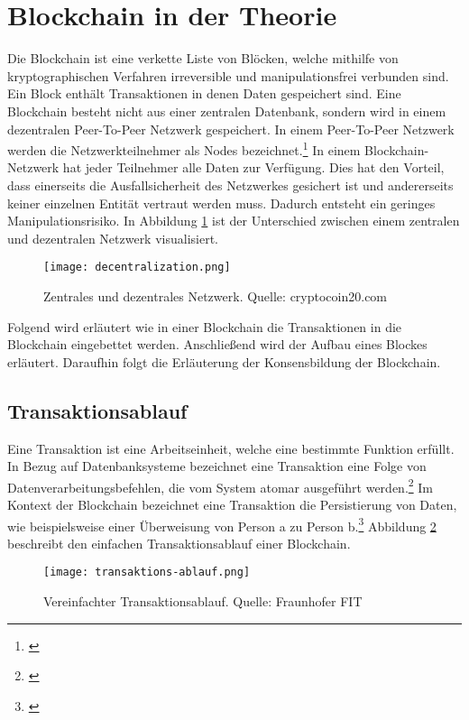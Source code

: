 \section{Blockchain in der Theorie}
\label{sec:Theorie}
Die Blockchain ist eine verkette Liste von Blöcken, welche mithilfe von kryptographischen Verfahren irreversible und manipulationsfrei verbunden sind. Ein Block enthält Transaktionen in denen Daten gespeichert sind. Eine Blockchain besteht nicht aus einer zentralen Datenbank, sondern wird in einem dezentralen Peer-To-Peer Netzwerk gespeichert. In einem Peer-To-Peer Netzwerk werden die Netzwerkteilnehmer als Nodes bezeichnet.\footnote{\cite[S.~5]{Korzun.2013}} In einem Blockchain-Netzwerk hat jeder Teilnehmer alle Daten zur Verfügung. Dies hat den Vorteil, dass einerseits die Ausfallsicherheit des Netzwerkes gesichert ist und andererseits keiner einzelnen Entität vertraut werden muss. Dadurch entsteht ein geringes Manipulationsrisiko. In Abbildung \ref{fig:dencentralized} ist der Unterschied zwischen einem zentralen und dezentralen Netzwerk visualisiert.

\begin{figure}[!h]
	\texttt{[image: decentralization.png]}
	\caption{Zentrales und dezentrales Netzwerk. Quelle: cryptocoin20.com}
	\label{fig:dencentralized}
\end{figure}

Folgend wird erläutert wie in einer Blockchain die Transaktionen in die Blockchain eingebettet werden. Anschließend wird der Aufbau eines Blockes erläutert. Daraufhin folgt die Erläuterung der Konsensbildung der Blockchain.

\subsection{Transaktionsablauf}
\label{subsec:transaktionsablauf}
Eine Transaktion ist eine Arbeitseinheit, welche eine bestimmte Funktion erf{\"u}llt. In Bezug auf Datenbanksysteme bezeichnet eine Transaktion eine Folge von Datenverarbeitungsbefehlen, die vom System atomar ausgef{\"u}hrt werden.\footnote{\cite[S.~301]{Kemper.2006}} Im Kontext der Blockchain bezeichnet eine Transaktion die Persistierung von Daten, wie beispielsweise einer {\"U}berweisung von Person a zu Person b.\footnote{\cite[S.~2]{SatoshiNakamoto.}} Abbildung \ref{fig:transaktionsablauf} beschreibt den einfachen Transaktionsablauf einer Blockchain.

\begin{figure}[h]
	\texttt{[image: transaktions-ablauf.png]}
	\caption{Vereinfachter Transaktionsablauf. Quelle: Fraunhofer FIT}
	\label{fig:transaktionsablauf}
\end{figure}

